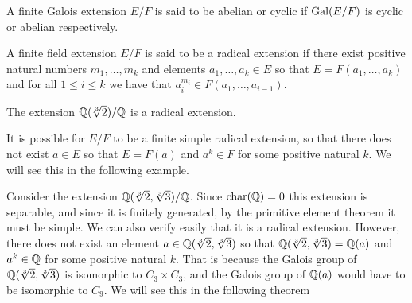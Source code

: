 \documentclass[11pt,a4paper]{article}
\begin{document}
\begin{remark}
  A finite Galois extension $E/F$ is said to be abelian
  or cyclic if $\operatorname{Gal}(E/F)$ is cyclic or abelian respectively.
\end{remark}

\begin{definition}
  A finite field extension $E/F$ is said to be a radical extension if there
  exist positive natural numbers $m_1,\dots,m_k$
  and elements $a_1,\dots,a_k \in E$ so that
  $E = F(a_1,\dots,a_k)$ and for all $1 \le i \le k$
  we have that $a_i^{m_i} \in F(a_1,\dots,a_{i-1})$.
\end{definition}

\begin{example}
  The extension $\mathbb{Q}(\sqrt[3]{2})/\mathbb{Q}$ is a radical extension.
\end{example}

\begin{remark}
  It is possible for $E/F$ to be a finite simple radical extension,
  so that there does not exist $a \in E$ so that $E = F(a)$ and
  $a^k \in F$ for some positive natural $k$.
  We will see this in the following example.
\end{remark}

\begin{example}
  Consider the extension $\mathbb{Q}(\sqrt[3]{2},\sqrt[3]{3})/\mathbb{Q}$.
  Since $\text{char}(\mathbb{Q}) = 0$ this extension is separable,
  and since it is finitely generated, by the primitive element
  theorem it must be simple.
  We can also verify easily that it is a radical extension.
  However, there does not exist an element $a \in \mathbb{Q}(\sqrt[3]{2},\sqrt[3]{3})$
  so that $\mathbb{Q}(\sqrt[3]{2},\sqrt[3]{3}) = \mathbb{Q}(a)$
  and $a^k \in \mathbb{Q}$ for some positive natural $k$.
  That is because the Galois group of $\mathbb{Q}(\sqrt[3]{2},\sqrt[3]{3})$
  is isomorphic to $C_3 \times C_3$,
  and the Galois group of $\mathbb{Q}(a)$ would have to be isomorphic to $C_9$.
  We will see this in the following theorem
\end{example}
\end{document}
